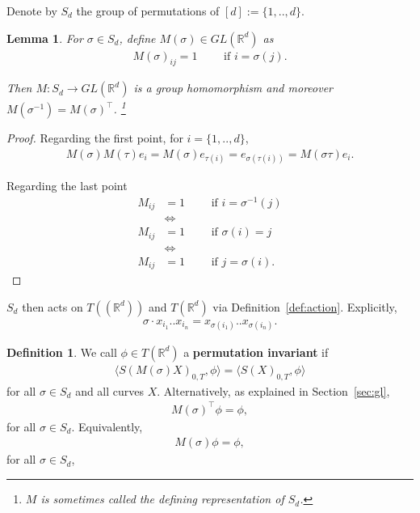 \documentclass{scrartcl}
\theoremstyle{plain}
\newtheorem{example}[theorem]{Example}
\newtheorem{lemma}[theorem]{Lemma}
\theoremstyle{definition}
\newtheorem{definition}[theorem]{Definition}
\newcommand{\R}{\mathbb{R}}
\newcommand{\1}[1]{1_{\{#1\}}}
\newcommand{\ds}{d} %
\newcommand{\TC}{T((\R^\ds))} %
\newcommand{\TS}{T(\R^\ds)} %
\begin{document}
Denote by $S_\ds$ the group of permutations of $[d] := \{1, .., \ds\}$.
\begin{lemma}
  For $\sigma \in S_\ds$,
  define $M(\sigma) \in GL(\R^d)$ as
  \begin{align*}
    M(\sigma)_{ij} = 1 \qquad \text{ if } i = \sigma(j).
  \end{align*}

  Then $M: S_\ds \to GL(\R^\ds)$ is a group homomorphism
  and
  moreover $M(\sigma^{-1}) = M(\sigma)^\top$.%
  \footnote{$M$ is sometimes called the \emph{defining representation} of $S_d$.}
\end{lemma}
\begin{proof}
  Regarding the first point, for $i=\{1,..,\ds\}$,
  \begin{align*}
    M(\sigma) M(\tau) e_i
    =
    M(\sigma) e_{\tau(i)}
    =
    e_{\sigma(\tau(i))}
    =
    M(\sigma \tau) e_i.
  \end{align*}

  Regarding the last point
  \begin{align*}
    M_{ij} &= 1 \qquad \text{ if } i = \sigma^{-1}(j) \\
      &\Leftrightarrow \\
    M_{ij} &= 1 \qquad \text{ if } \sigma( i ) = j \\
      &\Leftrightarrow \\
    M_{ij} &= 1 \qquad \text{ if }  j = \sigma( i ).
  \end{align*}
\end{proof}

$S_\ds$ then acts on $\TC$ and $\TS$ via Definition~\ref{def:action}.
Explicitly,
\begin{align*}
  \sigma \cdot x_{i_1} .. x_{i_n} = x_{\sigma(i_1)} .. x_{\sigma(i_n)}.
\end{align*}


\begin{definition}
  We call $\phi \in T(\R^\ds)$ a \textbf{permutation invariant} if
  \begin{align*}
    \Big\langle S( M(\sigma) X)_{0,T}, \phi \Big\rangle = \Big\langle S(X)_{0,T}, \phi \Big\rangle
  \end{align*}
  for all $\sigma \in S_\ds$ and all curves $X$.
  Alternatively, as explained in Section~\ref{sec:gl},
  \begin{align*}
    M(\sigma)^\top \phi = \phi,
  \end{align*}
  for all $\sigma \in S_\ds$.
  Equivalently,
  \begin{align*}
    M(\sigma) \phi = \phi,
  \end{align*}
  for all $\sigma \in S_\ds$,
\end{definition}
\end{document}
